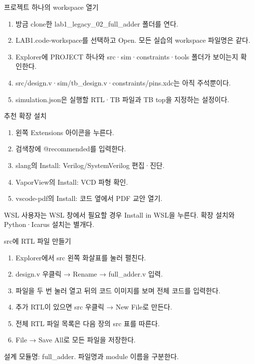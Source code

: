 \begin{frame}{프로젝트 하나의 workspace 열기}\relax
\small
\begin{enumerate}\setlength{\itemsep}{0.22cm}
\item 방금 clone한 lab1\_legacy\_02\_full\_adder 폴더를 연다.
\item LAB1.code-workspace를 선택하고 Open. 모든 실습의 workspace 파일명은 같다.
\item Explorer에 PROJECT 하나와 src·sim·constraints·tools 폴더가 보이는지 확인한다.
\item src/design.v·sim/tb\_design.v·constraints/pins.xdc는 아직 주석뿐이다.
\item simulation.json은 실행할 RTL·TB 파일과 TB top을 지정하는 설정이다.
\end{enumerate}

\end{frame}

\begin{frame}{추천 확장 설치}\relax
\small
\begin{enumerate}\setlength{\itemsep}{0.22cm}
\item 왼쪽 Extensions 아이콘을 누른다.
\item 검색창에 @recommended를 입력한다.
\item slang의 Install: Verilog/SystemVerilog 편집·진단.
\item VaporView의 Install: VCD 파형 확인.
\item vscode-pdf의 Install: 코드 옆에서 PDF 교안 열기.
\end{enumerate}
WSL 사용자는 WSL 창에서 필요할 경우 Install in WSL을 누른다. 확장 설치와 Python·Icarus 설치는 별개다.\par
\end{frame}

\begin{frame}{src에 RTL 파일 만들기}\relax
\small
\begin{enumerate}\setlength{\itemsep}{0.22cm}
\item Explorer에서 src 왼쪽 화살표를 눌러 펼친다.
\item design.v 우클릭 → Rename → full\_adder.v 입력.
\item 파일을 두 번 눌러 열고 뒤의 코드 이미지를 보며 전체 코드를 입력한다.
\item 추가 RTL이 있으면 src 우클릭 → New File로 만든다.
\item 전체 RTL 파일 목록은 다음 장의 src 표를 따른다.
\item File → Save All로 모든 파일을 저장한다.
\end{enumerate}
설계 모듈명: full\_adder. 파일명과 module 이름을 구분한다.\par
\end{frame}

